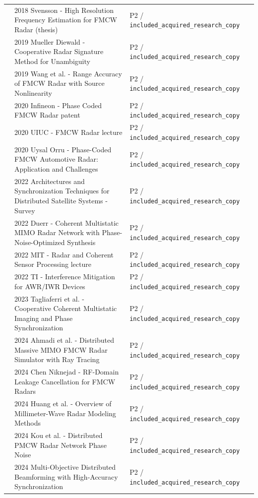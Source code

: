 \documentclass[11pt]{article}
\begin{document}
\begin{longtable}{@{}p{}p{}p{}p{}@{}}
 & 2018 Svensson - High Resolution Frequency Estimation for FMCW Radar (thesis) & P2 / \nolinkurl{included_acquired_research_copy} &  \\
 & 2019 Mueller Diewald - Cooperative Radar Signature Method for Unambiguity & P2 / \nolinkurl{included_acquired_research_copy} &  \\
 & 2019 Wang et al. - Range Accuracy of FMCW Radar with Source Nonlinearity & P2 / \nolinkurl{included_acquired_research_copy} &  \\
 & 2020 Infineon - Phase Coded FMCW Radar patent & P2 / \nolinkurl{included_acquired_research_copy} &  \\
 & 2020 UIUC - FMCW Radar lecture & P2 / \nolinkurl{included_acquired_research_copy} &  \\
 & 2020 Uysal Orru - Phase-Coded FMCW Automotive Radar: Application and Challenges & P2 / \nolinkurl{included_acquired_research_copy} &  \\
 & 2022 Architectures and Synchronization Techniques for Distributed Satellite Systems - Survey & P2 / \nolinkurl{included_acquired_research_copy} &  \\
 & 2022 Duerr - Coherent Multistatic MIMO Radar Network with Phase-Noise-Optimized Synthesis & P2 / \nolinkurl{included_acquired_research_copy} &  \\
 & 2022 MIT - Radar and Coherent Sensor Processing lecture & P2 / \nolinkurl{included_acquired_research_copy} &  \\
 & 2022 TI - Interference Mitigation for AWR/IWR Devices & P2 / \nolinkurl{included_acquired_research_copy} &  \\
 & 2023 Tagliaferri et al. - Cooperative Coherent Multistatic Imaging and Phase Synchronization & P2 / \nolinkurl{included_acquired_research_copy} &  \\
 & 2024 Ahmadi et al. - Distributed Massive MIMO FMCW Radar Simulator with Ray Tracing & P2 / \nolinkurl{included_acquired_research_copy} &  \\
 & 2024 Chen Niknejad - RF-Domain Leakage Cancellation for FMCW Radars & P2 / \nolinkurl{included_acquired_research_copy} &  \\
 & 2024 Huang et al. - Overview of Millimeter-Wave Radar Modeling Methods & P2 / \nolinkurl{included_acquired_research_copy} &  \\
 & 2024 Kou et al. - Distributed PMCW Radar Network Phase Noise & P2 / \nolinkurl{included_acquired_research_copy} &  \\
 & 2024 Multi-Objective Distributed Beamforming with High-Accuracy Synchronization & P2 / \nolinkurl{included_acquired_research_copy} &  \\

\end{longtable}
\end{document}
